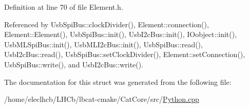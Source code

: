 Definition at line 70 of file Element.h.

Referenced by UsbSpiBus::clockDivider(), Element::connection(), Element::Element(), UsbSpiBus::init(), UsbI2cBus::init(), IOobject::init(), UsbMLSpiBus::init(), UsbMLI2cBus::init(), UsbSpiBus::read(), UsbI2cBus::read(), UsbSpiBus::setClockDivider(), Element::setConnection(), UsbSpiBus::write(), and UsbI2cBus::write().

The documentation for this struct was generated from the following file:\begin{DoxyCompactItemize}
\item 
/home/eleclhcb/LHCb/lbcat-\/cmake/CatCore/src/\hyperlink{CatCore_2src_2Python_8cpp}{Python.cpp}\end{DoxyCompactItemize}

